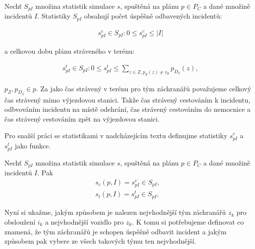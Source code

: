 \begin{definice}\label{df:statsSimul}
  Nechť $S_{pI}$ množina statistik simulace $s$, spuštěná na plánu $p \in P_C$ a dané množině incidentů $I$.
  Statistiky $S_{pI}$ obsahují počet úspěšně odbavených incidentů:

  \begin{align*}
    &s^{c}_{pI} \in S_{pI} \colon 0 \leq s^{c}_{pI} \leq |I|
  \end{align*}

  a celkovou dobu plánu stráveného v terénu:

  \begin{align*}
    &s^{t}_{pI} \in S_{pI} \colon 0 \leq s^{t}_{pI} \leq \sum_{z \in Z, p_Z(z) \neq v_{\emptyset}}{p_{D_2}(z)},
  \end{align*}

  $p_Z, p_{D_2} \in p$. Za jako čas strávený v terénu pro tým záchranářů považujeme celkový čas strávený mimo výjezdovou stanici.
  Takže čas strávený cestováním k incidentu, odbvováním incidentu na místě odehrání, čas strávený cestováním do nemocnice a čas strávený cestováním zpět na výjezdovou stanici.
\end{definice}

Pro snažší práci se statistikami v nadcházejícím textu definujme statistiky $s^c_{pI}$ a $s^t_{pI}$ jako funkce. 

\begin{definice}
  Nechť $S_{pI}$ množina statistik simulace $s$, spuštěná na plánu $p \in P_C$ a dané množině incidentů $I$.
  Pak
  \begin{align*}
    s_c(p, I) = s^c_{pI} \in S_{pI}, \\
    s_t(p, I) = s^t_{pI} \in S_{pI},
  \end{align*}
\end{definice}

Nyní si ukažme, jakým způsobem je nalezen nejvhodnější tým záchranářů $z_k$ pro obsloužení $i_k$ a nejvhodnější vozidlo pro $z_k$.
K tomu si potřebujeme definovat co znamená, že tým záchranářů je schopen úspěšně odbavit incident a jakým způsobem pak vybere ze všech takových týmu ten nejvhodnější.

